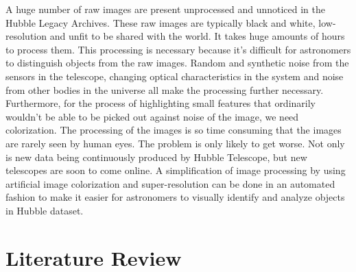 \documentclass[conference]{IEEEtran}
\begin{document}
A huge number of raw images are present unprocessed and unnoticed in the Hubble Legacy Archives. These raw images are typically black and white, low-resolution and unfit to be shared with the world. It takes huge amounts of hours to process them. This processing is necessary because it's difficult for astronomers to distinguish objects from the raw images. Random and synthetic noise from the sensors in the telescope, changing optical characteristics in the system and noise from other bodies in the universe all make the processing further necessary. Furthermore, for the process of highlighting small features that ordinarily wouldn't be able to be picked out against noise of the image, we need colorization. The processing of the images is so time consuming that the images are rarely seen by human eyes. The problem is only likely to get worse. Not only is new data being continuously produced by Hubble Telescope, but new telescopes are soon to come online. A simplification of image processing by using artificial image colorization and super-resolution can be done in an automated fashion to make it easier for astronomers to visually identify and analyze objects in Hubble dataset.
\section{Literature Review}
\end{document}
